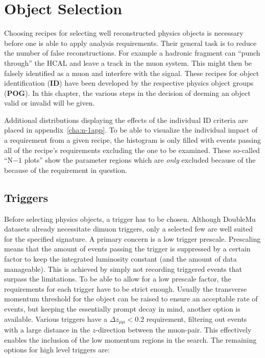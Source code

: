 \chapter{Object Selection}
\label{cha:objsel}

Choosing recipes for selecting well reconstructed physics objects is necessary before one is able to apply analysis requirements. Their general task is to reduce the number of false reconstructions. For example a hadronic fragment can ``punch through'' the HCAL and leave a track in the muon system. This might then be falsely identified as a muon and interfere with the signal. These recipes for object identification (\textbf{ID}) have been developed by the respective physics object groups (\textbf{POG}). In this chapter, the various steps in the decision of deeming an object valid or invalid will be given.

Additional distributions displaying the effects of the individual ID criteria are placed in appendix~\ref{cha:n-1app}. To be able to visualize the individual impact of a requirement from a given recipe, the histogram is only filled with events passing all of the recipe's requirements excluding the one to be examined. These so-called ``N$ - 1$ plots'' show the parameter regions which are \textit{only} excluded because of the because of the requirement in question.

\section{Triggers}
\label{sec:trigger}

Before selecting physics objects, a trigger has to be chosen. Although DoubleMu datasets already necessitate dimuon triggers, only a selected few are well suited for the specified signature. A primary concern is a low trigger prescale. Prescaling means that the amount of events passing the trigger is suppressed by a certain factor to keep the integrated luminosity constant (and the amount of data manageable). This is achieved by simply not recording triggered events that surpass the limitations. To be able to allow for a low prescale factor, the requirements for each trigger have to be strict enough. Usually the transverse momentum threshold for the object can be raised to ensure an acceptable rate of events, but keeping the essentially prompt decay in mind, another option is available. Various triggers have a $\Delta z_{\mu\mu} < 0.2$ requirement, filtering out events with a large distance in the $z$-direction between the muon-pair. This effectively enables the inclusion of the low momentum regions in the search. The remaining options for high level triggers are:

